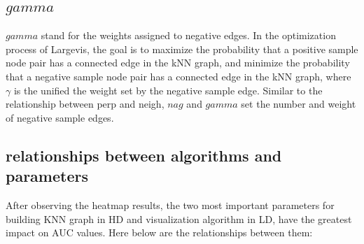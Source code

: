 \subsection{$gamma$}

$gamma$ stand for the weights assigned to negative edges. In the optimization process of Largevis, the goal is to maximize the probability that a positive sample node pair has a connected edge in the kNN graph, and minimize the probability that a negative sample node pair has a connected edge in the kNN graph, where $\gamma$ is the unified the weight set by the negative sample edge. Similar to the relationship between perp and neigh, $nag$ and $gamma$ set the number and weight of negative sample edges.

\subsection{relationships between algorithms and parameters}


After observing the heatmap results, the two most important parameters for building KNN graph in HD and visualization algorithm in LD, have the greatest impact on AUC values. Here below are the relationships between them:

\begin{figure}[H]
\centering  %
\end{figure}

